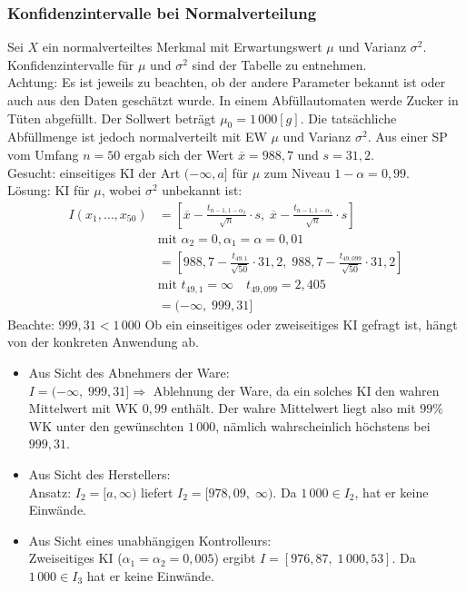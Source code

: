 \documentclass{scrreprt}
\begin{document}
\subsubsection{Konfidenzintervalle bei Normalverteilung}
Sei $X$ ein normalverteiltes Merkmal mit Erwartungswert $\mu$ und Varianz $\sigma^2$. Konfidenzintervalle für $\mu$ und $\sigma^2$ sind der Tabelle zu entnehmen.\\
Achtung: Es ist jeweils zu beachten, ob der andere Parameter bekannt ist oder auch aus den Daten geschätzt wurde.
In einem Abfüllautomaten werde Zucker in Tüten abgefüllt. Der Sollwert beträgt $\mu_0 = 1\,000\unit{[g]}$. Die tatsächliche Abfüllmenge ist jedoch normalverteilt mit EW $\mu$ und Varianz $\sigma^2$. Aus einer SP vom Umfang $n=50$ ergab sich der Wert $\overline{x}=988,7$ und $s=31,2$.\\
Gesucht: einseitiges KI der Art $(-\infty, a]$ für $\mu$ zum Niveau $1-\alpha = 0,99$.\\
Lösung: KI für $\mu$, wobei $\sigma^2$ unbekannt ist:
\begin{align*}
I(x_1, \ldots, x_{50}) &= \left[ \overline{x}-\frac{t_{n-1,1-\alpha_2}}{\sqrt{n}} \cdot s, \; \overline{x}-\frac{t_{n-1,1-\alpha_1}}{\sqrt{n}} \cdot s \right]\\
& \text{mit }\alpha_2=0, \alpha_1=\alpha=0,01\\
&=\left[988,7 - \frac{t_{49,1}}{\sqrt{50}}\cdot 31,2, \; 988,7 - \frac{t_{49,099}}{\sqrt{50}}\cdot 31,2\right]\\
& \text{mit }t_{49,1} = \infty \quad t_{49,099}=2,405\\
&= (-\infty,\; 999,31]
\end{align*}
Beachte: $999,31 < 1\,000$
 Ob ein einseitiges oder zweiseitiges KI gefragt ist, hängt von der konkreten Anwendung ab.
\begin{itemize}
\item Aus Sicht des Abnehmers der Ware:\\
$I=(-\infty,\; 999,31] \Rightarrow$ Ablehnung der Ware, da ein solches KI den wahren Mittelwert mit WK $0,99$ enthält. Der wahre Mittelwert liegt also mit $99\%$ WK unter den gewünschten $1\,000$, nämlich wahrscheinlich höchstens bei $999,31$.
\item Aus Sicht des Herstellers:\\
Ansatz: $I_2 = [a,\infty)$ liefert $I_2=[978,09,\; \infty)$. Da $1\,000 \in I_2$, hat er keine Einwände.
\item Aus Sicht eines unabhängigen Kontrolleurs:\\
Zweiseitiges KI ($\alpha_1 = \alpha_2 = 0,005$) ergibt $I=[976,87, \; 1\,000,53]$. Da $1\,000 \in I_3$ hat er keine Einwände.
\end{itemize}
\end{document}
